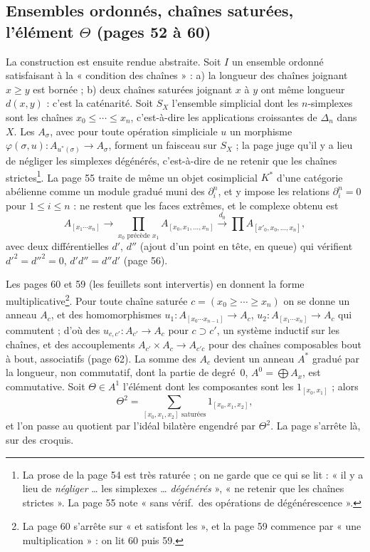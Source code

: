 \documentclass[11pt,a4paper]{article}
\begin{document}
\subsection*{Ensembles ordonnés, chaînes saturées, l'élément $\Theta$ (pages 52 à 60)}

La construction est ensuite rendue abstraite. Soit $I$ un ensemble ordonné
satisfaisant à la « condition des chaînes » : a) la longueur des chaînes joignant
$x \geq y$ est bornée ; b) deux chaînes saturées joignant $x$ à $y$ ont même
longueur $d(x, y)$ : c'est la caténarité. Soit $S_X$ l'ensemble simplicial dont
les $n$-simplexes sont les chaînes $x_0 \leq \cdots \leq x_n$, c'est-à-dire les
applications croissantes de $\Delta_n$ dans $X$. Les $A_\sigma$, avec pour toute
opération simpliciale $u$ un morphisme $\varphi(\sigma, u) : A_{u^{*}(\sigma)} \to
A_\sigma$, forment un faisceau sur $S_X$ ; la page juge qu'il y a lieu de négliger
les simplexes dégénérés, c'est-à-dire de ne retenir que les chaînes
strictes\footnote{La prose de la page 54 est très raturée ; on ne garde que ce
qui se lit : « il y a lieu de \emph{négliger} … les simplexes … \emph{dégénérés} »,
« ne retenir que les chaînes strictes ». La page 55 note « sans vérif.\ des
opérations de dégénérescence ».}. La page 55 traite de même un objet
cosimplicial $K^{*}$ d'une catégorie abélienne comme un module gradué muni des
$\partial^n_i$, et y impose les relations $\partial^n_i = 0$ pour $1 \leq i \leq
n$ : ne restent que les faces extrêmes, et le complexe obtenu est
\[
A_{[x_1 \cdots x_n]} \longrightarrow \prod_{x_0 \text{ précède } x_1}
A_{[x_0, x_1, \ldots, x_n]} \xrightarrow{\ d_0\ } \prod A_{[x'_0, x_0, \ldots, x_n]},
\]
avec deux différentielles $d'$, $d''$ (ajout d'un point en tête, en queue) qui
vérifient $d'^2 = d''^2 = 0$, $d'd'' = d''d'$ (page 56).

Les pages 60 et 59 (les feuillets sont intervertis) en donnent la forme
multiplicative\footnote{La page 60 s'arrête sur « et satisfont les », et la page
59 commence par « une multiplication » : on lit 60 puis 59.}. Pour toute chaîne
saturée $c = (x_0 \geq \cdots \geq x_n)$ on se donne un anneau $A_c$, et des
homomorphismes $u_1 : A_{[x_0 \cdots x_{n-1}]} \to A_c$, $u_2 : A_{[x_1 \cdots x_n]}
\to A_c$ qui commutent ; d'où des $u_{c,c'} : A_{c'} \to A_c$ pour $c \supset c'$,
un système inductif sur les chaînes, et des accouplements $A_{c'} \times A_c \to
A_{c'c}$ pour des chaînes composables bout à bout, associatifs (page 62). La
somme des $A_c$ devient un anneau $A^{*}$ gradué par la longueur, non
commutatif, dont la partie de degré~$0$, $A^0 = \bigoplus A_x$, est commutative.
Soit $\Theta \in A^1$ l'élément dont les composantes sont les
$1_{[x_0, x_1]}$ ; alors
\[
\Theta^2 = \sum_{[x_0, x_1, x_2] \text{ saturées}} 1_{[x_0, x_1, x_2]},
\]
et l'on passe au quotient par l'idéal bilatère engendré par $\Theta^2$. La page
s'arrête là, sur des croquis.
\end{document}
